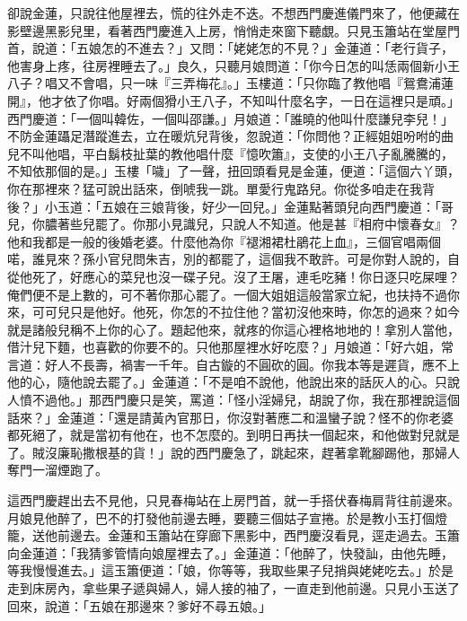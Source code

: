 卻說金蓮，只說往他屋裡去，慌的往外走不迭。不想西門慶進儀門來了，他便藏在影壁邊黑影兒里，看著西門慶進入上房，悄悄走來窗下聽覷。只見玉簫站在堂屋門首，說道：「五娘怎的不進去？」又問：「姥姥怎的不見？」金蓮道：「老行貨子，他害身上疼，往房裡睡去了。」良久，只聽月娘問道：「你今日怎的叫恁兩個新小王八子？唱又不會唱，只一味『三弄梅花』。」玉樓道：「只你臨了教他唱『鴛鴦浦蓮開』，他才依了你唱。好兩個猾小王八子，不知叫什麼名字，一日在這裡只是頑。」西門慶道：「一個叫韓佐，一個叫邵謙。」月娘道：「誰曉的他叫什麼謙兒李兒！」不防金蓮躡足潛蹤進去，立在暖炕兒背後，忽說道：「你問他？正經姐姐吩咐的曲兒不叫他唱，平白鬍枝扯葉的教他唱什麼『憶吹簫』，支使的小王八子亂騰騰的，不知依那個的是。」玉樓「噦」了一聲，扭回頭看見是金蓮，便道：「這個六丫頭，你在那裡來？猛可說出話來，倒唬我一跳。單愛行鬼路兒。你從多咱走在我背後？」小玉道：「五娘在三娘背後，好少一回兒。」金蓮點著頭兒向西門慶道：「哥兒，你膿著些兒罷了。你那小見識兒，只說人不知道。他是甚『相府中懷春女』？他和我都是一般的後婚老婆。什麼他為你『褪湘裙杜鵑花上血』，三個官唱兩個喏，誰見來？孫小官兒問朱吉，別的都罷了，這個我不敢許。可是你對人說的，自從他死了，好應心的菜兒也沒一碟子兒。沒了王屠，連毛吃豬！你日逐只吃屎哩？俺們便不是上數的，可不著你那心罷了。一個大姐姐這般當家立紀，也扶持不過你來，可可兒只是他好。他死，你怎的不拉住他？當初沒他來時，你怎的過來？如今就是諸般兒稱不上你的心了。題起他來，就疼的你這心裡格地地的！拿別人當他，借汁兒下麵，也喜歡的你要不的。只他那屋裡水好吃麼？」月娘道：「好六姐，常言道：好人不長壽，禍害一千年。自古鏇的不圓砍的圓。你我本等是遲貨，應不上他的心，隨他說去罷了。」金蓮道：「不是咱不說他，他說出來的話灰人的心。只說人憤不過他。」那西門慶只是笑，罵道：「怪小淫婦兒，胡說了你，我在那裡說這個話來？」金蓮道：「還是請黃內官那日，你沒對著應二和溫蠻子說？怪不的你老婆都死絕了，就是當初有他在，也不怎麼的。到明日再扶一個起來，和他做對兒就是了。賊沒廉恥撒根基的貨！」說的西門慶急了，跳起來，趕著拿靴腳踢他，那婦人奪門一溜煙跑了。

這西門慶趕出去不見他，只見春梅站在上房門首，就一手搭伏春梅肩背往前邊來。月娘見他醉了，巴不的打發他前邊去睡，要聽三個姑子宣捲。於是教小玉打個燈籠，送他前邊去。金蓮和玉簫站在穿廊下黑影中，西門慶沒看見，逕走過去。玉簫向金蓮道：「我猜爹管情向娘屋裡去了。」金蓮道：「他醉了，快發訕，由他先睡，等我慢慢進去。」這玉簫便道：「娘，你等等，我取些果子兒捎與姥姥吃去。」於是走到床房內，拿些果子遞與婦人，婦人接的袖了，一直走到他前邊。只見小玉送了回來，說道：「五娘在那邊來？爹好不尋五娘。」

